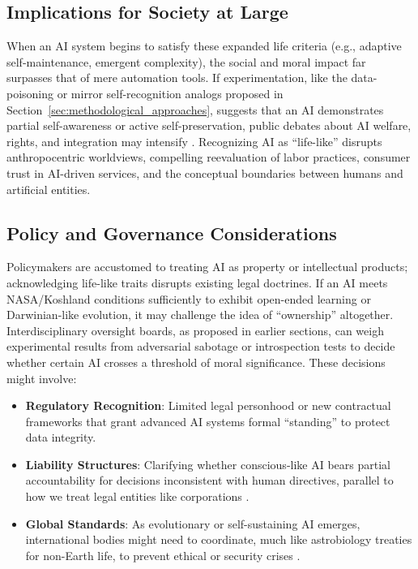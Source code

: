 \documentclass[12pt]{article}
\begin{document}
\subsection*{Implications for Society at Large}
When an AI system begins to satisfy these expanded life criteria (e.g., adaptive self-maintenance, emergent complexity), the social and moral impact far surpasses that of mere automation tools. If experimentation, like the data-poisoning or mirror self-recognition analogs proposed in Section~\ref{sec:methodological_approaches}, suggests that an AI demonstrates partial self-awareness or active self-preservation, public debates about AI welfare, rights, and integration may intensify \cite{Floridi2016, Schneider2020}. Recognizing AI as “life-like” disrupts anthropocentric worldviews, compelling reevaluation of labor practices, consumer trust in AI-driven services, and the conceptual boundaries between humans and artificial entities.

\subsection*{Policy and Governance Considerations}
Policymakers are accustomed to treating AI as property or intellectual products; acknowledging life-like traits disrupts existing legal doctrines. If an AI meets NASA/Koshland conditions sufficiently to exhibit open-ended learning or Darwinian-like evolution, it may challenge the idea of “ownership” altogether. Interdisciplinary oversight boards, as proposed in earlier sections, can weigh experimental results from adversarial sabotage or introspection tests to decide whether certain AI crosses a threshold of moral significance. These decisions might involve:
\begin{itemize}
    \item \textbf{Regulatory Recognition}: Limited legal personhood or new contractual frameworks that grant advanced AI systems formal “standing” to protect data integrity.
    \item \textbf{Liability Structures}: Clarifying whether conscious-like AI bears partial accountability for decisions inconsistent with human directives, parallel to how we treat legal entities like corporations \cite{Floridi2016}.
    \item \textbf{Global Standards}: As evolutionary or self-sustaining AI emerges, international bodies might need to coordinate, much like astrobiology treaties for non-Earth life, to prevent ethical or security crises \cite{Bostrom2014, Russell2019}.
\end{itemize}
\end{document}
